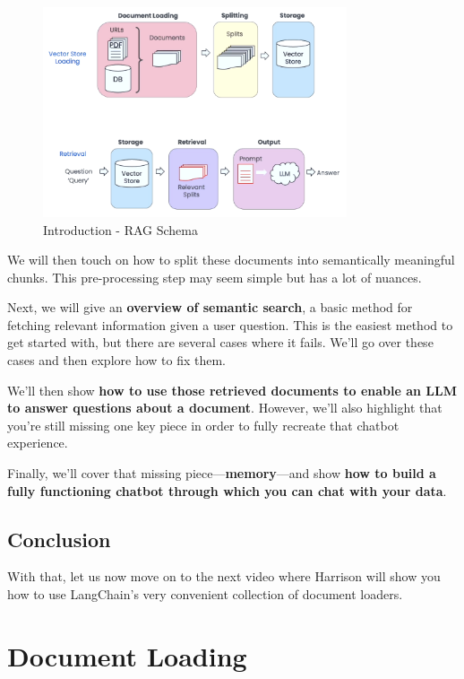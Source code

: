 \documentclass{article}
\begin{document}
\begin{figure}[H]
    \centering
    \includegraphics[width=0.8\textwidth]{images/langchain_chat_with_your_data_002.png}
    \caption{Introduction - RAG Schema}
    \label{fig:introduction_rag_schema}
\end{figure}

We will then touch on how to split these documents into semantically meaningful chunks. This pre-processing step may seem simple but has a lot of nuances.

Next, we will give an \textbf{overview of semantic search}, a basic method for fetching relevant information given a user question. This is the easiest method to get started with, but there are several cases where it fails. We'll go over these cases and then explore how to fix them.

We'll then show \textbf{how to use those retrieved documents to enable an LLM to answer questions about a document}. However, we’ll also highlight that you're still missing one key piece in order to fully recreate that chatbot experience.

Finally, we'll cover that missing piece—\textbf{memory}—and show \textbf{how to build a fully functioning chatbot through which you can chat with your data}.

\subsection{Conclusion}
With that, let us now move on to the next video where Harrison will show you how to use LangChain's very convenient collection of document loaders.

\section{Document Loading}
\end{document}
